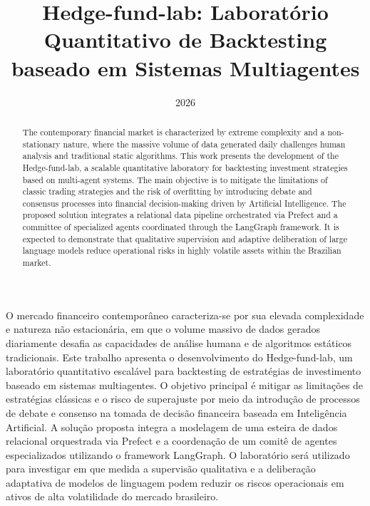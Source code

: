 \documentclass{eic-bcc-tcc}
\title{Hedge-fund-lab: Laboratório Quantitativo de Backtesting baseado em Sistemas Multiagentes}
\date{2026}
\begin{document}
\maketitle



\makeapproval

\begin{resumo}
O mercado financeiro contemporâneo caracteriza-se por sua elevada complexidade e natureza não estacionária, em que o volume massivo de dados gerados diariamente desafia as capacidades de análise humana e de algoritmos estáticos tradicionais. Este trabalho apresenta o desenvolvimento do Hedge-fund-lab, um laboratório quantitativo escalável para backtesting de estratégias de investimento baseado em sistemas multiagentes. O objetivo principal é mitigar as limitações de estratégias clássicas e o risco de superajuste por meio da introdução de processos de debate e consenso na tomada de decisão financeira baseada em Inteligência Artificial. A solução proposta integra a modelagem de uma esteira de dados relacional orquestrada via Prefect e a coordenação de um comitê de agentes especializados utilizando o framework LangGraph. O laboratório será utilizado para investigar em que medida a supervisão qualitativa e a deliberação adaptativa de modelos de linguagem podem reduzir os riscos operacionais em ativos de alta volatilidade do mercado brasileiro.
\end{resumo}

\begin{abstract}
The contemporary financial market is characterized by extreme complexity and a non-stationary nature, where the massive volume of data generated daily challenges human analysis and traditional static algorithms. This work presents the development of the Hedge-fund-lab, a scalable quantitative laboratory for backtesting investment strategies based on multi-agent systems. The main objective is to mitigate the limitations of classic trading strategies and the risk of overfitting by introducing debate and consensus processes into financial decision-making driven by Artificial Intelligence. The proposed solution integrates a relational data pipeline orchestrated via Prefect and a committee of specialized agents coordinated through the LangGraph framework. It is expected to demonstrate that qualitative supervision and adaptive deliberation of large language models reduce operational risks in highly volatile assets within the Brazilian market.
\end{abstract}
\end{document}
